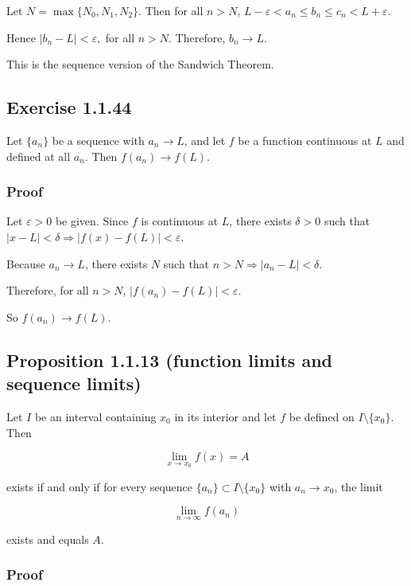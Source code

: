 \documentclass[11pt,a4paper]{article}
\begin{document}
Let \(N=\max\{N_0,N_1,N_2\}\). Then for all \(n>N\),
\(L-\varepsilon<a_n\le b_n\le c_n<L+\varepsilon.\)

Hence \(|b_n-L|<\varepsilon,\) for all \(n>N\). Therefore, \(b_n\to L\).

This is the sequence version of the Sandwich Theorem.

\subsection{Exercise 1.1.44}\label{exercise-1.1.44}

Let \(\{a_n\}\) be a sequence with \(a_n\to L\), and let \(f\) be a
function continuous at \(L\) and defined at all \(a_n\). Then
\(f(a_n)\to f(L).\)

\subsubsection{Proof}\label{proof-5}

Let \(\varepsilon>0\) be given. Since \(f\) is continuous at \(L\),
there exists \(\delta>0\) such that
\(|x-L|<\delta \Rightarrow |f(x)-f(L)|<\varepsilon.\)

Because \(a_n\to L\), there exists \(N\) such that
\(n>N \Rightarrow |a_n-L|<\delta.\)

Therefore, for all \(n>N\), \(|f(a_n)-f(L)|<\varepsilon.\)

So \(f(a_n)\to f(L)\).

\subsection{Proposition 1.1.13 (function limits and sequence
limits)}\label{proposition-1.1.13-function-limits-and-sequence-limits}

Let \(I\) be an interval containing \(x_0\) in its interior and let
\(f\) be defined on \(I\setminus\{x_0\}\). Then

\[
\lim_{x\to x_0}f(x)=A
\]

exists if and only if for every sequence
\(\{a_n\}\subset I\setminus\{x_0\}\) with \(a_n\to x_0\), the limit

\[
\lim_{n\to\infty}f(a_n)
\]

exists and equals \(A\).

\subsubsection{Proof}\label{proof-6}
\end{document}
